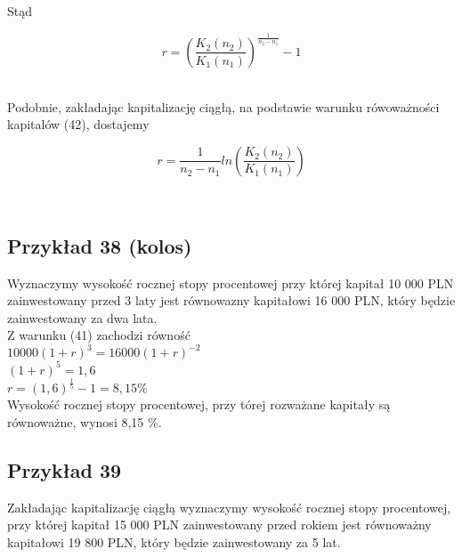 \documentclass{article}
\begin{document}
Stąd\\

\begin{center}
	\begin{equation}
		r = (\frac{K_2(n_2)}{K_1(n_1)})^{\frac{1}{n_2-n_1}} - 1
	\end{equation}
\end{center}\\

Podobnie, zakładając kapitalizację ciągłą, na podstawie warunku rówoważności kapitalów (42), dostajemy\\

\begin{center}
	\begin{equation}
		r = \frac{1}{n_2 - n_1}ln(\frac{K_2(n_2)}{K_1(n_1)})
	\end{equation}
\end{center}\\

\subsection{Przykład 38 (kolos)}

Wyznaczymy wysokość rocznej stopy procentowej przy której kapitał 10 000 PLN zainwestowany przed 3 laty jest równowazny kapitałowi 16 000 PLN, który będzie zainwestowany za dwa lata.\\

Z warunku (41) zachodzi równość\\

$ 10 000(1 + r)^3 = 16 000(1 + r)^{-2} $\\

$ (1 + r)^5 = 1,6 $\\

$ r = (1,6)^{\frac{1}{5}} - 1 = 8,15 \% $\\

Wysokość rocznej stopy procentowej, przy tórej rozważane kapitały są równoważne, wynosi 8,15 \%.\\

\subsection{Przykład 39}

Zakładając kapitalizację ciągłą wyznaczymy wysokość rocznej stopy procentowej, przy której kapitał 15 000 PLN zainwestowany przed rokiem jest równoważny kapitałowi 19 800 PLN, który będzie zainwestowany za 5 lat.\\
\end{document}

